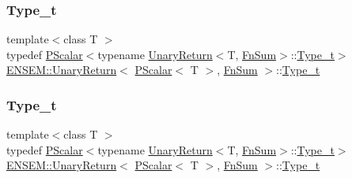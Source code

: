 \subsubsection{\texorpdfstring{Type\_t}{Type\_t}\hspace{0.1cm}{\footnotesize\ttfamily [1/3]}}
{\footnotesize\ttfamily template$<$class T $>$ \\
typedef \mbox{\hyperlink{classENSEM_1_1PScalar}{P\+Scalar}}$<$typename \mbox{\hyperlink{structENSEM_1_1UnaryReturn}{Unary\+Return}}$<$T, \mbox{\hyperlink{structENSEM_1_1FnSum}{Fn\+Sum}}$>$\+::\mbox{\hyperlink{structENSEM_1_1UnaryReturn_3_01PScalar_3_01T_01_4_00_01FnSum_01_4_abc54c8d313930663db099556679c774a}{Type\+\_\+t}}$>$ \mbox{\hyperlink{structENSEM_1_1UnaryReturn}{E\+N\+S\+E\+M\+::\+Unary\+Return}}$<$ \mbox{\hyperlink{classENSEM_1_1PScalar}{P\+Scalar}}$<$ T $>$, \mbox{\hyperlink{structENSEM_1_1FnSum}{Fn\+Sum}} $>$\+::\mbox{\hyperlink{structENSEM_1_1UnaryReturn_3_01PScalar_3_01T_01_4_00_01FnSum_01_4_abc54c8d313930663db099556679c774a}{Type\+\_\+t}}}

\mbox{\label{structENSEM_1_1UnaryReturn_3_01PScalar_3_01T_01_4_00_01FnSum_01_4_abc54c8d313930663db099556679c774a}} 
\subsubsection{\texorpdfstring{Type\_t}{Type\_t}\hspace{0.1cm}{\footnotesize\ttfamily [2/3]}}
{\footnotesize\ttfamily template$<$class T $>$ \\
typedef \mbox{\hyperlink{classENSEM_1_1PScalar}{P\+Scalar}}$<$typename \mbox{\hyperlink{structENSEM_1_1UnaryReturn}{Unary\+Return}}$<$T, \mbox{\hyperlink{structENSEM_1_1FnSum}{Fn\+Sum}}$>$\+::\mbox{\hyperlink{structENSEM_1_1UnaryReturn_3_01PScalar_3_01T_01_4_00_01FnSum_01_4_abc54c8d313930663db099556679c774a}{Type\+\_\+t}}$>$ \mbox{\hyperlink{structENSEM_1_1UnaryReturn}{E\+N\+S\+E\+M\+::\+Unary\+Return}}$<$ \mbox{\hyperlink{classENSEM_1_1PScalar}{P\+Scalar}}$<$ T $>$, \mbox{\hyperlink{structENSEM_1_1FnSum}{Fn\+Sum}} $>$\+::\mbox{\hyperlink{structENSEM_1_1UnaryReturn_3_01PScalar_3_01T_01_4_00_01FnSum_01_4_abc54c8d313930663db099556679c774a}{Type\+\_\+t}}}

